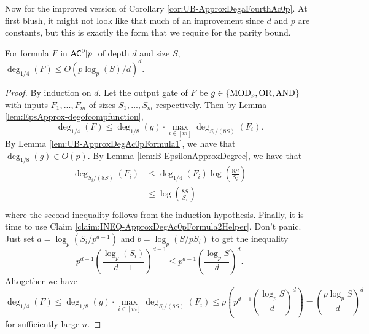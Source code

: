 \documentclass[11pt]{article}
\begin{document}
	Now for the improved version of Corollary	\ref{cor:UB-ApproxDegaFourthAc0p}. At first blush, it might not look like that much of an improvement since $d$ and $p$ are constants, but this is exactly the form that we require for the parity bound. 
	\begin{lemma}
		\label{lem:UB-ApproxDegaFourthAc0p2}
		For formula $F$ in $\mathsf{AC}^0[p]$ of depth $d$ and size $S$, $\deg_{1/4}(F) \leq O(p\log_p(S)/d)^d$. 
	\end{lemma}
	\begin{proof}
		By induction on $d$. Let the output gate of $F$ be $g \in \{\mathrm{MOD}_p, \mathrm{OR}, \mathrm{AND}\}$ with inputs $F_1, ..., F_m$ of sizes $S_1, ..., S_m$ respectively. Then by Lemma \ref{lem:EpsApprox-degofcompfunction}, 
		\[\deg_{1/4}(F) \leq \deg_{1/8}(g) \cdot \max_{i \in [m]}\deg_{S_i/(8S)}(F_i).\]
		By Lemma \ref{lem:UB-ApproxDegAc0pFormula1}, we have that $\deg_{1/8}(g) \in O(p)$. By Lemma \ref{lem:B-EpsilonApproxDegree}, we have that 
		\begin{align*}
			\deg_{S_i/(8S)}(F_i) &\leq \deg_{1/4}(F_i)\log\left(\frac{8S}{S_i}\right)\\
			 &\leq \log\left(\frac{8S}{S_i}\right)\\
		\end{align*}
		where the second inequality follows from the induction hypothesis. Finally, it is time to use Claim \ref{claim:INEQ-ApproxDegAc0pFormula2Helper}. Don't panic. Just set $a = \log_{p}(S_i/p^{d-1})$ and $b = \log_{p}(S/pS_i)$ to get the inequality
		\[p^{d-1} \left(\frac{\log_{p}(S_i)}{d-1}\right)^{d-1}\leq p^{d-1}\left(\frac{\log_{p}S}{d}\right)^d.\]
		Altogether we have 
		\[\deg_{1/4}(F) \leq \deg_{1/8}(g) \cdot \max_{i \in [m]}\deg_{S_i/(8S)}(F_i) \leq p\left(p^{d-1}\left(\frac{\log_{p}S}{d}\right)^d\right) = \left(\frac{p\log_{p} S}{d}\right)^d\]
		for sufficiently large $n$. 
	\end{proof}
\end{document}
